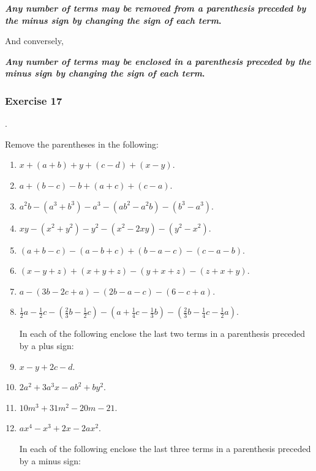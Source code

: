 \documentclass{book}
\begin{document}
\textbf{\textit{Any number of terms may be removed from a
parenthesis preceded by the minus sign by changing the sign of
each term}.}

And conversely,

\textbf{\textit{Any number of terms may be enclosed in a
parenthesis preceded by the minus sign by changing the sign of
each term}.}

\subsubsection*{Exercise 17}.

Remove the parentheses in the following:
\begin{enumerate}
\item $x + (a + b) + y + (c - d) + (x - y)$.

\item $a + (b - c) - b + (a + c) + (c - a)$.

\item $a^{2}b - (a^{3} + b^{3}) - a^{3} - (ab^{2} - a^{2}b)
-(b^{3} - a^{3})$.

\item $xy - (x^{2} + y^{2}) - y^{2} - (x^{2} - 2xy) - (y^{2} -
x^{2})$.

\item $(a + b - c) - (a - b + c) + (b - a - c) - (c - a - b)$.

\item $(x - y + z) + (x + y + z) - (y + x + z) - (z + x + y)$.

\item  $a - (3b - 2c + a) - (2b - a - c) - (6 - c + a)$.

\item $\frac{1}{2}a - \frac{1}{2}c - (\frac{2}{3}b - \frac{1}{2}c)
- (a + \frac{1}{4}c - \frac{1}{3}b) - (\frac{2}{3}b - \frac{1}{4}c
- \frac{1}{2}a)$.

In each of the following enclose the last two terms in a
parenthesis preceded by a plus sign:

\item $x - y + 2c - d$.

\item $2 a^2 + 3a^3x-ab^2 + by^2$.

\item $10 m^3 +31m^2-20m-21$.

\item $ax^4 - x^3 + 2x - 2ax^2$.

In each of the following enclose the last three terms in a
parenthesis preceded by a minus sign:


\end{enumerate}
\end{document}
